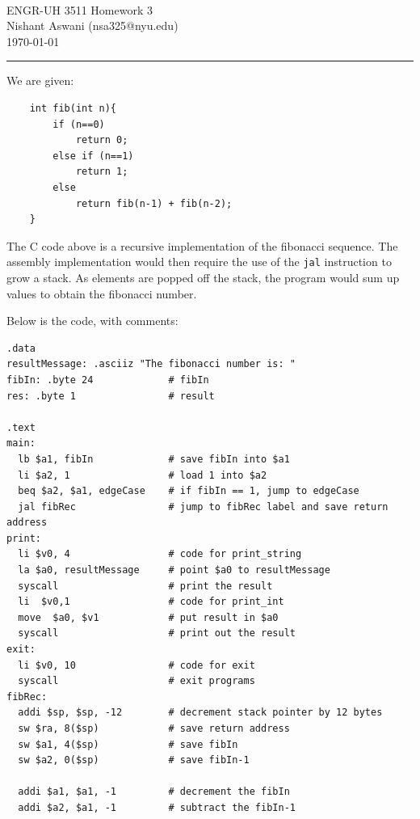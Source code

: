 \documentclass[11pt]{exam}
\makeatletter
\newcommand{\myname}{Nishant Aswani}
\newcommand{\myemail}{nsa325@nyu.edu}
\newcommand{\myhwtype}{Homework}
\newcommand{\myhwnum}{3}
\newcommand{\mycoursenumber}{ENGR-UH 3511}
\newcommand{\cc}[1]{\texttt{#1}}
\newcounter{questionCounter}
\newcounter{partCounter}[questionCounter]
\newenvironment{namedquestion}[1]{%
    \addtocounter{questionCounter}{1}%
    \setcounter{partCounter}{0}%
    \vspace{.2in}%
        \noindent{\bf #1}%
    \vspace{0.3em} \hrule \vspace{.1in}%
}{}
\makeatother
\begin{document}
\

{\newpage}


\thispagestyle{plain}
\begin{center}
  {\Large \mycoursenumber{} \myhwtype{} \myhwnum} \\
  \myname{} (\myemail{}) \\
  \today
\end{center}

\setcounter{questionCounter}{0}

\begin{namedquestion}{Question 2.31}

We are given:
\begin{lstlisting}
    int fib(int n){
        if (n==0)
            return 0;
        else if (n==1)
            return 1;
        else 
            return fib(n-1) + fib(n-2);
    }
\end{lstlisting}

The C code above is a recursive implementation of the fibonacci sequence. The assembly implementation would then require the use of the \cc{jal} instruction to grow a stack. As elements are popped off the stack, the program would sum up values to obtain the fibonacci number. 

Below is the code, with comments: 

\begin{verbatim}
.data
resultMessage: .asciiz "The fibonacci number is: "
fibIn: .byte 24             # fibIn
res: .byte 1                # result

.text
main:
  lb $a1, fibIn             # save fibIn into $a1
  li $a2, 1                 # load 1 into $a2
  beq $a2, $a1, edgeCase    # if fibIn == 1, jump to edgeCase
  jal fibRec                # jump to fibRec label and save return address
print:
  li $v0, 4                 # code for print_string
  la $a0, resultMessage     # point $a0 to resultMessage
  syscall                   # print the result
  li  $v0,1                 # code for print_int
  move  $a0, $v1            # put result in $a0
  syscall                   # print out the result
exit:
  li $v0, 10                # code for exit
  syscall                   # exit programs  
fibRec: 
  addi $sp, $sp, -12        # decrement stack pointer by 12 bytes
  sw $ra, 8($sp)            # save return address 
  sw $a1, 4($sp)            # save fibIn
  sw $a2, 0($sp)            # save fibIn-1
  
  addi $a1, $a1, -1         # decrement the fibIn
  addi $a2, $a1, -1         # subtract the fibIn-1
  

\end{verbatim}
\end{namedquestion}
\end{document}
